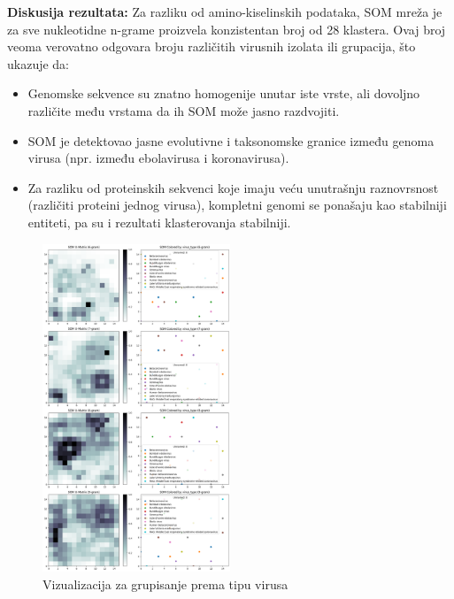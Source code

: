 \documentclass[a4paper,12pt]{article}
\begin{document}
\textbf{Diskusija rezultata:}
Za razliku od amino-kiselinskih podataka, SOM mreža je za sve nukleotidne n-grame proizvela konzistentan broj od 28 klastera. Ovaj broj veoma verovatno odgovara broju različitih virusnih izolata ili grupacija, što ukazuje da:

\begin{itemize}
    \item Genomske sekvence su znatno homogenije unutar iste vrste, ali dovoljno različite među vrstama da ih SOM može jasno razdvojiti.
    \item SOM je detektovao jasne evolutivne i taksonomske granice između genoma virusa (npr. između ebolavirusa i koronavirusa).
    \item Za razliku od proteinskih sekvenci koje imaju veću unutrašnju raznovrsnost (različiti proteini jednog virusa), kompletni genomi se ponašaju kao stabilniji entiteti, pa su i rezultati klasterovanja stabilniji.
\end{itemize}

\begin{figure}[h!]
    \centering
    \includegraphics[width=0.5\textwidth]{images/nucleotide-virus.png}
    \caption{Vizualizacija za grupisanje prema tipu virusa}
    \label{fig:som-struktura1}
\end{figure}
\end{document}
